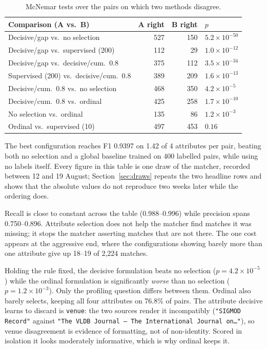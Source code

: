 \documentclass[11pt]{article}
\begin{document}
\begin{table}[h]
\centering
\begin{tabular}{lrrl}
\toprule
Comparison (A vs.\ B) & A right & B right & $p$ \\
\midrule
Decisive/gap vs.\ no selection            & 527 & 150 & $5.2\times10^{-50}$ \\
Decisive/gap vs.\ supervised (200)        & 112 &  29 & $1.0\times10^{-12}$ \\
Decisive/gap vs.\ decisive/cum.\ 0.8      & 375 & 112 & $3.5\times10^{-34}$ \\
Supervised (200) vs.\ decisive/cum.\ 0.8  & 389 & 209 & $1.6\times10^{-13}$ \\
Decisive/cum.\ 0.8 vs.\ no selection      & 468 & 350 & $4.2\times10^{-5}$ \\
Decisive/cum.\ 0.8 vs.\ ordinal           & 425 & 258 & $1.7\times10^{-10}$ \\
No selection vs.\ ordinal                 & 135 &  86 & $1.2\times10^{-3}$ \\
Ordinal vs.\ supervised (10)              & 497 & 453 & $0.16$ \\
\bottomrule
\end{tabular}
\caption{McNemar tests over the pairs on which two methods disagree.}
\end{table}

The best configuration reaches F1 0.9397 on 1.42 of 4 attributes per pair, beating both no
selection and a global baseline trained on 400 labelled pairs, while using no labels
itself. Every figure in this table is one draw of the matcher, recorded between 12 and 19
August; Section~\ref{sec:draws} repeats the two headline rows and shows that the absolute
values do not reproduce two weeks later while the ordering does.

Recall is close to constant across the table (0.988--0.996) while precision spans
0.750--0.896. Attribute selection does not help the matcher find matches it was missing; it
stops the matcher asserting matches that are not there. The one cost appears at the
aggressive end, where the configurations showing barely more than one attribute give up
18--19 of 2{,}224 matches.

Holding the rule fixed, the decisive formulation beats no selection
($p = 4.2\times10^{-5}$) while the ordinal formulation is significantly \emph{worse} than
no selection ($p = 1.2\times10^{-3}$). Only the profiling question differs between them.
Ordinal also barely selects, keeping all four attributes on 76.8\% of pairs. The attribute
decisive learns to discard is \texttt{venue}: the two sources render it incompatibly
(\texttt{"SIGMOD Record"} against \texttt{"The VLDB Journal --- The International Journal
on\ldots"}), so venue disagreement is evidence of formatting, not of non-identity. Scored in
isolation it looks moderately informative, which is why ordinal keeps it.
\end{document}
